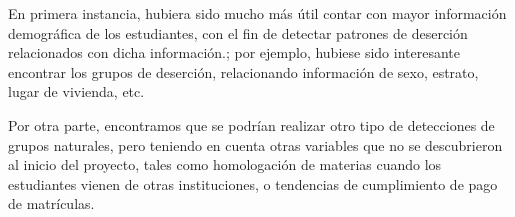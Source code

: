 \documentclass[fleqn,10pt]{SelfArx} %
\begin{document}
En primera instancia, hubiera sido mucho más útil contar con mayor información demográfica de los estudiantes, con el fin de detectar patrones de deserción relacionados con dicha información.; por ejemplo, hubiese sido interesante encontrar los grupos de deserción, relacionando información de sexo, estrato, lugar de vivienda, etc.

Por otra parte, encontramos que se podrían realizar otro tipo de detecciones de grupos naturales, pero teniendo en cuenta otras variables que no se descubrieron al inicio del proyecto, tales como homologación de materias cuando los estudiantes vienen de otras instituciones, o tendencias de cumplimiento de pago de matrículas.






\end{document}
